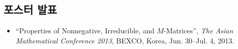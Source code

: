\documentclass[11pt]{article} %
\begin{document}
\subsection*{포스터 발표}
\newcommand\myposter{
	\begin{itemize}[leftmargin=*]
		\item ``Properties of Nonnegative, Irreducible, and $M$-Matrices'', {\it The Asian Mathematical Conference 2013}, BEXCO, Korea, Jun. 30--Jul. 4, 2013.
	\end{itemize}
}
\myposter

\newpage\setcounter{page}{1}






%

\profileeng

%


%
\end{document}
